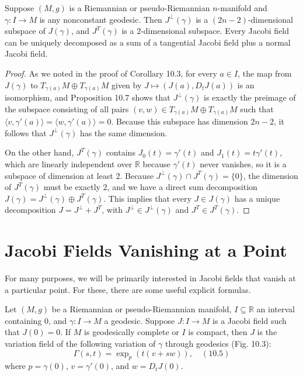 \begin{corollary}
\label{cor:jacobi-field-decomposition}

Suppose $(M, g)$ is a Riemannian or pseudo-Riemannian $n$-manifold and $\gamma: I \to M$ is any nonconstant geodesic. Then $J^{\perp}(\gamma)$ is a $(2n-2)$-dimensional subspace of $J(\gamma)$, and $J^T(\gamma)$ is a 2-dimensional subspace. Every Jacobi field can be uniquely decomposed as a sum of a tangential Jacobi field plus a normal Jacobi field.

\begin{proof}
As we noted in the proof of Corollary 10.3, for every $a \in I$, the map from $J(\gamma)$ to $T_{\gamma(a)} M \oplus T_{\gamma(a)} M$ given by $J \mapsto (J(a), D_t J(a))$ is an isomorphism, and Proposition 10.7 shows that $J^{\perp}(\gamma)$ is exactly the preimage of the subspace consisting of all pairs $(v, w) \in T_{\gamma(a)} M \oplus T_{\gamma(a)} M$ such that $\langle v, \gamma'(a) \rangle = \langle w, \gamma'(a) \rangle = 0$. Because this subspace has dimension $2n-2$, it follows that $J^{\perp}(\gamma)$ has the same dimension.

On the other hand, $J^T(\gamma)$ contains $J_0(t) = \gamma'(t)$ and $J_1(t) = t \gamma'(t)$, which are linearly independent over $\mathbb{R}$ because $\gamma'(t)$ never vanishes, so it is a subspace of dimension at least 2. Because $J^{\perp}(\gamma) \cap J^T(\gamma) = \{0\}$, the dimension of $J^T(\gamma)$ must be exactly 2, and we have a direct sum decomposition $J(\gamma) = J^{\perp}(\gamma) \oplus J^T(\gamma)$. This implies that every $J \in J(\gamma)$ has a unique decomposition $J = J^{\perp} + J^T$, with $J^{\perp} \in J^{\perp}(\gamma)$ and $J^T \in J^T(\gamma)$.
\end{proof}
\end{corollary}

\section{Jacobi Fields Vanishing at a Point}

For many purposes, we will be primarily interested in Jacobi fields that vanish at a particular point. For these, there are some useful explicit formulas.

\begin{lemma}
\label{lem:jacobi-field-variation}
Let $(M, g)$ be a Riemannian or pseudo-Riemannian manifold, $I \subseteq \mathbb{R}$ an interval containing $0$, and $\gamma : I \to M$ a geodesic. Suppose $J : I \to M$ is a Jacobi field such that $J(0) = 0$. If $M$ is geodesically complete or $I$ is compact, then $J$ is the variation field of the following variation of $\gamma$ through geodesics (Fig. 10.3):
$$\Gamma(s,t) = \exp_p(t(v + sw)), \quad (10.5)$$
where $p = \gamma(0)$, $v = \gamma'(0)$, and $w = D_t J(0)$.
\end{lemma}

